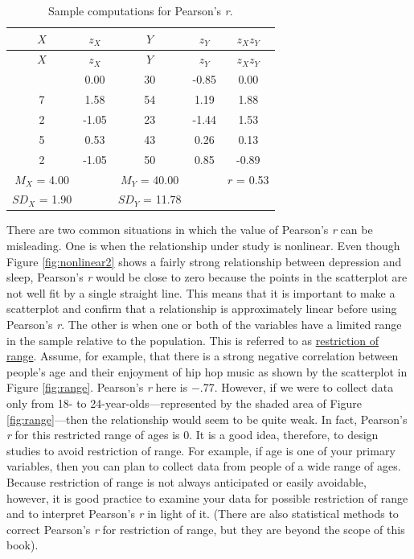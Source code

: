 \documentclass[
]{krantz}
\begin{document}
\begin{longtable}[]{@{}ccccc@{}}
\caption{\label{tab:pearsonmath} Sample computations for Pearson's \emph{r}.}\tabularnewline
\toprule\noalign{}
\(X\) & \(z_X\) & \(Y\) & \(z_Y\) & \(z_Xz_Y\) \\
\midrule\noalign{}
\endfirsthead
\toprule\noalign{}
\(X\) & \(z_X\) & \(Y\) & \(z_Y\) & \(z_Xz_Y\) \\
\midrule\noalign{}
\endhead
\bottomrule\noalign{}
\endlastfoot
4 & 0.00 & 30 & -0.85 & 0.00 \\
7 & 1.58 & 54 & 1.19 & 1.88 \\
2 & -1.05 & 23 & -1.44 & 1.53 \\
5 & 0.53 & 43 & 0.26 & 0.13 \\
2 & -1.05 & 50 & 0.85 & -0.89 \\
\(M_X\) = 4.00 & & \(M_Y\) = 40.00 & & \(r\) = 0.53 \\
\(SD_X\) = 1.90 & & \(SD_Y\) = 11.78 & & \\
\end{longtable}

There are two common situations in which the value of Pearson's \emph{r} can be misleading. One is when the relationship under study is nonlinear. Even though Figure \ref{fig:nonlinear2} shows a fairly strong relationship between depression and sleep, Pearson's \emph{r} would be close to zero because the points in the scatterplot are not well fit by a single straight line. This means that it is important to make a scatterplot and confirm that a relationship is approximately linear before using Pearson's \emph{r}. The other is when one or both of the variables have a limited range in the sample relative to the population. This is referred to as \hyperref[restriction-of-range]{restriction of range}. Assume, for example, that there is a strong negative correlation between people's age and their enjoyment of hip hop music as shown by the scatterplot in Figure \ref{fig:range}. Pearson's \emph{r} here is −.77. However, if we were to collect data only from 18- to 24-year-olds---represented by the shaded area of Figure \ref{fig:range}---then the relationship would seem to be quite weak. In fact, Pearson's \emph{r} for this restricted range of ages is 0. It is a good idea, therefore, to design studies to avoid restriction of range. For example, if age is one of your primary variables, then you can plan to collect data from people of a wide range of ages. Because restriction of range is not always anticipated or easily avoidable, however, it is good practice to examine your data for possible restriction of range and to interpret Pearson's \emph{r} in light of it. (There are also statistical methods to correct Pearson's \emph{r} for restriction of range, but they are beyond the scope of this book).
\end{document}
